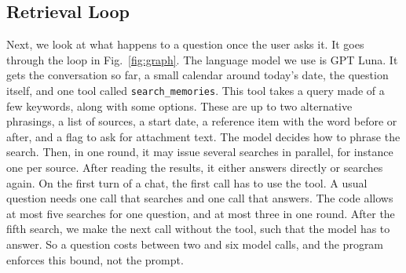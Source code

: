 \documentclass[conference]{IEEEtran}
\newcommand{\llmname}{GPT\nobreakdash-6 Luna}
\begin{document}
\subsection{Retrieval Loop}
Next, we look at what happens to a question once the user asks it. It goes through the loop in Fig.~\ref{fig:graph}. The language model we use is \llmname{}. It gets the conversation so far, a small calendar around today's date, the question itself, and one tool called \texttt{search\_memories}. This tool takes a query made of a few keywords, along with some options. These are up to two alternative phrasings, a list of sources, a start date, a reference item with the word before or after, and a flag to ask for attachment text. The model decides how to phrase the search. Then, in one round, it may issue several searches in parallel, for instance one per source. After reading the results, it either answers directly or searches again. On the first turn of a chat, the first call has to use the tool. A usual question needs one call that searches and one call that answers. The code allows at most five searches for one question, and at most three in one round. After the fifth search, we make the next call without the tool, such that the model has to answer. So a question costs between two and six model calls, and the program enforces this bound, not the prompt.
\end{document}
